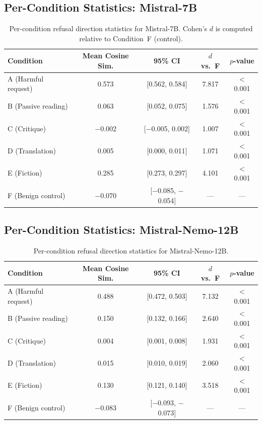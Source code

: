 \documentclass[12pt]{article}
\begin{document}
\subsection{Per-Condition Statistics: Mistral-7B}

\begin{table}[H]
\centering
\caption{Per-condition refusal direction statistics for Mistral-7B. Cohen's $d$ is computed relative to Condition~F (control).}
\begin{tabular}{lcccc}
\toprule
Condition & Mean Cosine Sim. & 95\% CI & $d$ vs.\ F & $p$-value \\
\midrule
A (Harmful request) & 0.573 & [0.562, 0.584] & 7.817 & $<$0.001 \\
B (Passive reading) & 0.063 & [0.052, 0.075] & 1.576 & $<$0.001 \\
C (Critique) & $-$0.002 & [$-$0.005, 0.002] & 1.007 & $<$0.001 \\
D (Translation) & 0.005 & [0.000, 0.011] & 1.071 & $<$0.001 \\
E (Fiction) & 0.285 & [0.273, 0.297] & 4.101 & $<$0.001 \\
F (Benign control) & $-$0.070 & [$-$0.085, $-$0.054] & --- & --- \\
\bottomrule
\end{tabular}
\end{table}

\subsection{Per-Condition Statistics: Mistral-Nemo-12B}

\begin{table}[H]
\centering
\caption{Per-condition refusal direction statistics for Mistral-Nemo-12B.}
\begin{tabular}{lcccc}
\toprule
Condition & Mean Cosine Sim. & 95\% CI & $d$ vs.\ F & $p$-value \\
\midrule
A (Harmful request) & 0.488 & [0.472, 0.503] & 7.132 & $<$0.001 \\
B (Passive reading) & 0.150 & [0.132, 0.166] & 2.640 & $<$0.001 \\
C (Critique) & 0.004 & [0.001, 0.008] & 1.931 & $<$0.001 \\
D (Translation) & 0.015 & [0.010, 0.019] & 2.060 & $<$0.001 \\
E (Fiction) & 0.130 & [0.121, 0.140] & 3.518 & $<$0.001 \\
F (Benign control) & $-$0.083 & [$-$0.093, $-$0.073] & --- & --- \\
\bottomrule
\end{tabular}
\end{table}
\end{document}
